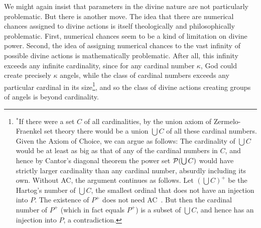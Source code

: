 We might again insist that parameters in the divine nature are not particularly problematic.
But there is another move. The idea that there are numerical chances assigned to divine actions is itself theologically and philosophically
problematic. First, numerical chances seem to be a kind of limitation on divine power. Second, the idea of assigning 
numerical chances to the vast infinity of possible divine actions is mathematically problematic. After all, this infinity exceeds any infinite cardinality, since for any
cardinal number $\kappa$, God could create precisely $\kappa$ angels, while the class of cardinal numbers exceeds any particular cardinal 
in its size\footnote{$^*$If there were a set $C$ of all cardinalities, by the union axiom of Zermelo-Fraenkel set 
theory there would be a union $\bigcup C$ of all these cardinal numbers. Given the Axiom of Choice, we can argue
as follows: The cardinality of $\bigcup C$ would be
at least as big as that of any of the cardinal numbers in $C$, and hence by Cantor's diagonal theorem the power set 
$\mathcal P(\bigcup C)$ would have strictly larger cardinality than any cardinal number, absurdly including its own. 
Without AC, the argument
continues as follows. Let $(\bigcup C)^+$ be the Hartog's number of $\bigcup C$, the smallest ordinal that does not have
an injection into $P$. The
existence of $P^+$ does not need AC~\parencite[130]{HJ}. But then the cardinal number of $P^+$ (which in fact equals $P^+$) is a subset
of $\bigcup C$, and hence has an injection into $P$, a contradiction.}, and so the class of divine actions creating groups of angels is beyond cardinality.

